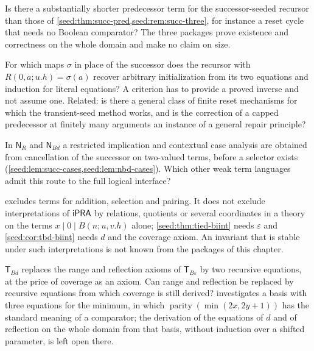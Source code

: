 \begin{question}
Is there a substantially shorter predecessor term for the successor-seeded
recursor than those of \cref{seed:thm:succ-pred,seed:rem:succ-three}, for
instance a reset cycle that needs no Boolean comparator? The three packages
prove existence and correctness on the whole domain and make no claim on
size.
\end{question}

\begin{question}
For which maps $\sigma$ in place of the successor does the recursor with
$R(0,a;u.h)=\sigma(a)$ recover arbitrary initialization from its two
equations and induction for literal equations? A criterion has to provide a
proved inverse and not assume one. Related: is there a general class of
finite reset mechanisms for which the transient-seed method works, and is
the correction of a capped predecessor at finitely many arguments an
instance of a general repair principle?
\end{question}

\begin{question}
In $\mathsf{N}_R$ and $\mathsf{N}_{Bd}$ a restricted implication and
contextual case analysis are obtained from cancellation of the successor on
two-valued terms, before a selector exists
(\cref{seed:lem:succ-cases,seed:lem:nbd-cases}). Which other weak term
languages admit this route to the full logical interface?
\end{question}

\begin{question}
 excludes terms for addition, selection and
pairing. It does not exclude interpretations of $\mathsf{iPRA}$ by relations,
quotients or several coordinates in a theory on the terms
$x\mid0\mid B(n;u,v.h)$ alone; \cref{seed:thm:tied-biint} needs
$\varepsilon$ and \cref{seed:cor:tbd-biint} needs $d$ and the coverage
axiom. An invariant that is stable under such interpretations is not known
from the packages of this chapter.
\end{question}

\begin{question}
$\mathsf{T}_{Bd}$ replaces the range and reflection axioms of
$\mathsf{T}_{B\varepsilon}$ by two recursive equations, at the price of
coverage as an axiom. Can range and reflection be replaced by recursive
equations from which coverage is still derived? 
investigates a basis with three equations for the minimum, in which
$\operatorname{parity}(\min(2x,2y+1))$ has the standard meaning of a
comparator; the derivation of the equations of $d$ and of reflection on the
whole domain from that basis, without induction over a shifted parameter, is
left open there.
\end{question}

